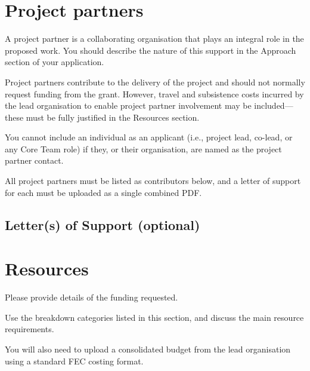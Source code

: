 \documentclass[12pt]{article}
\newenvironment{instruction}{%
    \begin{tcolorbox}[colback=red!5,colframe=red,title=Instruction]%
}{%
    \end{tcolorbox}%
}
\begin{document}


\pagebreak

\section{Project partners}

\begin{instruction}

A project partner is a collaborating organisation that plays an integral role in the proposed work. You should describe the nature of this support in the Approach section of your application.

Project partners contribute to the delivery of the project and should not normally request funding from the grant. However, travel and subsistence costs incurred by the lead organisation to enable project partner involvement may be included—these must be fully justified in the Resources section.

You cannot include an individual as an applicant (i.e., project lead, co-lead, or any Core Team role) if they, or their organisation, are named as the project partner contact.

All project partners must be listed as contributors below, and a letter of support for each must be uploaded as a single combined PDF.

\end{instruction}

\subsection{Letter(s) of Support (optional)}

\pagebreak

\section{Resources}

\begin{instruction}

Please provide details of the funding requested.

Use the breakdown categories listed in this section, and discuss the main resource requirements.

You will also need to upload a consolidated budget from the lead organisation using a standard FEC costing format.

\end{instruction}
\end{document}
